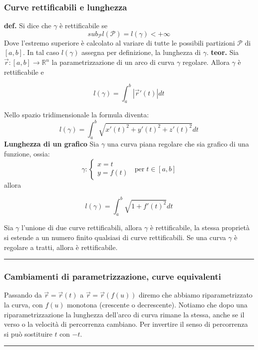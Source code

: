 \subsubsection*{Curve rettificabili e lunghezza}
\textbf{def.} Si dice che $\gamma$ è rettificabile se 
\[
    sub_\mathcal{P} l(\mathcal{P}) = l(\gamma) < + \infty
\]
Dove l'estremo superiore è calcolato al variare di tutte le possibili partizioni $\mathcal{P}$ di $[a,b]$.\newline
In tal caso $l(\gamma)$ assegna per definizione, la lunghezza di $\gamma$.\newline
\newline
\textbf{teor.} Sia $\vec{r}:[a,b] \rightarrow \mathbb{R}^n$ la parametrizzazione di un arco di curva $\gamma$ regolare. Allora $\gamma$ è rettificabile e 
\begin{tcolorbox}
\[
    l(\gamma) = \int_{a}^{b}|\vec{r}'(t)| dt
\]
\end{tcolorbox}
Nello spazio tridimensionale la formula diventa:
\[
    l(\gamma)= \int_{a}^{b}\sqrt{x'(t)^2 + y'(t)^2 + z'(t)^2}dt
\]
\textbf{Lunghezza di un grafico}\newline
Sia $\gamma$ una curva piana regolare che sia grafico di una funzione, ossia:
\[
    \gamma : \begin{cases}
        x =t \\
        y= f(t)
    \end{cases} \;\; \text{per} \;t \in[a,b]
\]
allora
\begin{tcolorbox}
\[
    l(\gamma) = \int_{a}^{b}\sqrt{1+f'(t)^2}dt
\]
\end{tcolorbox}
Sia $\gamma$ l'unione di due curve rettificabili, allora $\gamma$ è rettificabile, la stessa proprietà si estende a un numero finito qualsiasi di curve rettificabili. \newline
\newline
Se una curva $\gamma$ è regolare a tratti, allora è rettificabile.\newline
\rule{\textwidth}{0,4pt}
\subsubsection*{Cambiamenti di parametrizzazione, curve equivalenti}
Passando da $\vec{r} = \vec{r} (t)$ a $\vec{r} = \vec{r} (f(u))$ diremo che abbiamo riparametrizzato la curva, con $f(u)$ monotona (crescente o decrescente).\newline
Notiamo che dopo una riparametrizzazione la lunghezza dell'arco di curva rimane la stessa, anche se il verso o la velocità di percorrenza cambiano.\newline
Per invertire il senso di percorrenza si può sostituire $t$ con $-t$.\newline
\rule{\textwidth}{0,4pt}
